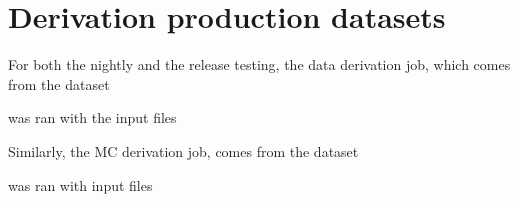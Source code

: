 \section{Derivation production datasets} 
\label{app: deriv job dataset}


For both the nightly and the release testing, the data derivation job, which comes from the dataset 



was ran with the input files 



Similarly, the MC derivation job, comes from the dataset 



was ran with input files


